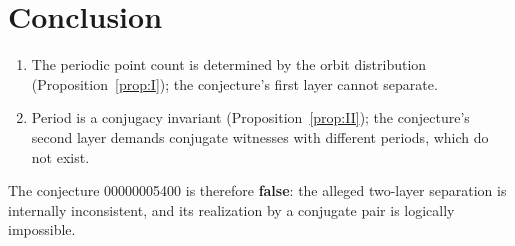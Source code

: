 \documentclass[11pt]{article}
\theoremstyle{definition}
\begin{document}
\section{Conclusion}

\begin{enumerate}
\item[(a)] The periodic point count is determined by the orbit distribution
(Proposition~\ref{prop:I}); the conjecture's first layer cannot separate.
\item[(b)] Period is a conjugacy invariant (Proposition~\ref{prop:II}); the
conjecture's second layer demands conjugate witnesses with different periods,
which do not exist.
\end{enumerate}

The conjecture 00000005400 is therefore \textbf{false}: the alleged two-layer
separation is internally inconsistent, and its realization by a conjugate pair is
logically impossible.
\end{document}
